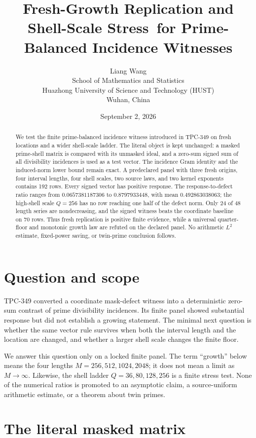 \documentclass[10pt]{article}
\title{Fresh-Growth Replication and Shell-Scale Stress\
       for Prime-Balanced Incidence Witnesses}
\author{Liang Wang\\
School of Mathematics and Statistics\\
Huazhong University of Science and Technology (HUST)\\
Wuhan, China}
\date{September 2, 2026}
\begin{document}
\maketitle

\begin{abstract}
We test the finite prime-balanced incidence witness introduced in TPC-349 on
fresh locations and a wider shell-scale ladder.  The literal object is kept
unchanged: a masked prime-shell matrix is compared with its unmasked ideal,
and a zero-sum signed sum of all divisibility incidences is used as a test
vector.  The incidence Gram identity and the induced-norm lower bound remain
exact.  A predeclared panel with three fresh origins, four interval lengths,
four shell scales, two source laws, and two kernel exponents contains 192
rows.  Every signed vector has positive response.  The response-to-defect
ratio ranges from $0.0657381187306$ to $0.8797933448$, with mean
$0.492863038063$; the high-shell scale $Q=256$ has no row reaching one half
of the defect norm.  Only 24 of 48 length series are nondecreasing, and the
signed witness beats the coordinate baseline on 70 rows.  Thus fresh
replication is positive finite evidence, while a universal quarter-floor and
monotonic growth law are refuted on the declared panel.  No arithmetic
$L^2$ estimate, fixed-power saving, or twin-prime conclusion follows.
\end{abstract}

\section{Question and scope}

TPC-349 converted a coordinate mask-defect witness into a deterministic
zero-sum contrast of prime divisibility incidences.  Its finite panel showed
substantial response but did not establish a growing statement.  The minimal
next question is whether the same vector rule survives when both the interval
length and the location are changed, and whether a larger shell scale changes
the finite floor.

We answer this question only on a locked finite panel.  The term ``growth''
below means the four lengths $M=256,512,1024,2048$; it does not mean a limit as
$M\to\infty$.  Likewise, the shell ladder $Q=36,80,128,256$ is a finite
stress test.  None of the numerical ratios is promoted to an asymptotic
claim, a source-uniform arithmetic estimate, or a theorem about twin primes.

\section{The literal masked matrix}
\end{document}
